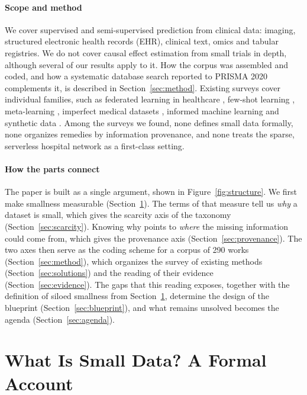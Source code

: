 \documentclass[acmsmall,screen,review]{acmart}
\theoremstyle{acmdefinition}
\begin{document}
\paragraph{Scope and method} We cover supervised and semi-supervised prediction from clinical data: imaging, structured electronic health records (EHR), clinical text, omics and tabular registries. We do not cover causal effect estimation from small trials in depth, although several of our results apply to it. How the corpus was assembled and coded, and how a systematic database search reported to PRISMA 2020 complements it, is described in Section~\ref{sec:method}. Existing surveys cover individual families, such as federated learning in healthcare \cite{nguyen2022federated,rieke2020future,xu2021federated}, few-shot learning \cite{wang2020generalizing}, meta-learning \cite{hospedales2022meta}, imperfect medical datasets \cite{cheplygina2019not,tajbakhsh2020embracing}, informed machine learning \cite{rueden2023informed} and synthetic data \cite{chen2021synthetic,jordon2022synthetic}. Among the surveys we found, none defines small data formally, none organizes remedies by information provenance, and none treats the sparse, serverless hospital network as a first-class setting.

\paragraph{How the parts connect} The paper is built as a single argument, shown in Figure~\ref{fig:structure}. We first make smallness measurable (Section~\ref{sec:definition}). The terms of that measure tell us \emph{why} a dataset is small, which gives the scarcity axis of the taxonomy (Section~\ref{sec:scarcity}). Knowing why points to \emph{where} the missing information could come from, which gives the provenance axis (Section~\ref{sec:provenance}). The two axes then serve as the coding scheme for a corpus of 290 works (Section~\ref{sec:method}), which organizes the survey of existing methods (Section~\ref{sec:solutions}) and the reading of their evidence (Section~\ref{sec:evidence}). The gaps that this reading exposes, together with the definition of siloed smallness from Section~\ref{sec:definition}, determine the design of the blueprint (Section~\ref{sec:blueprint}), and what remains unsolved becomes the agenda (Section~\ref{sec:agenda}).

\section{What Is Small Data? A Formal Account}\label{sec:definition}
\end{document}
